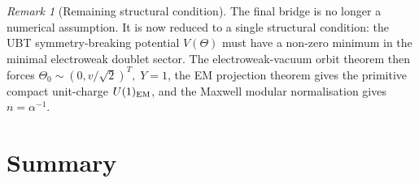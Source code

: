 \documentclass[12pt,a4paper]{article}
\theoremstyle{definition}\newtheorem{definition}[theorem]{Definition}
\theoremstyle{remark}\newtheorem{remark}[theorem]{Remark}
\begin{document}
\begin{remark}[Remaining structural condition]
The final bridge is no longer a numerical assumption.  It is now reduced to a
single structural condition: the UBT symmetry-breaking potential \(V(\Theta)\)
must have a non-zero minimum in the minimal electroweak doublet sector.  The
electroweak-vacuum orbit theorem then forces
\(\Theta_0\sim(0,v/\sqrt2)^T,\;Y=1\), the EM projection theorem gives the
primitive compact unit-charge \(U(1)_{\rm EM}\), and the Maxwell modular
normalisation gives \(n=\alpha^{-1}\).
\end{remark}

\section{Summary}
\label{sec:summary}
\end{document}
